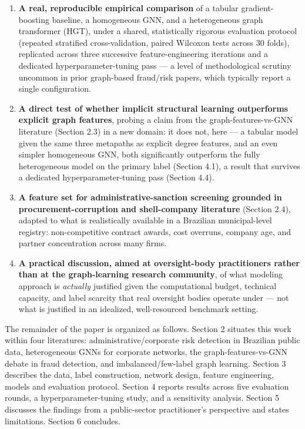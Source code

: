 \documentclass[11pt,]{article}
\providecommand{\tightlist}{%
  \setlength{\itemsep}{0pt}\setlength{\parskip}{0pt}}
\begin{document}
\begin{enumerate}
\def\labelenumi{\arabic{enumi}.}
\tightlist
\item
  \textbf{A real, reproducible empirical comparison} of a tabular
  gradient-boosting baseline, a homogeneous GNN, and a heterogeneous
  graph transformer (HGT), under a shared, statistically rigorous
  evaluation protocol (repeated stratified cross-validation, paired
  Wilcoxon tests across 30 folds), replicated across three successive
  feature-engineering iterations and a dedicated hyperparameter-tuning
  pass --- a level of methodological scrutiny uncommon in prior
  graph-based fraud/risk papers, which typically report a single
  configuration.
\item
  \textbf{A direct test of whether implicit structural learning
  outperforms explicit graph features}, probing a claim from the
  graph-features-vs-GNN literature (Section 2.3) in a new domain: it
  does not, here --- a tabular model given the same three metapaths as
  explicit degree features, and an even simpler homogeneous GNN, both
  significantly outperform the fully heterogeneous model on the primary
  label (Section 4.1), a result that survives a dedicated
  hyperparameter-tuning pass (Section 4.4).
\item
  \textbf{A feature set for administrative-sanction screening grounded
  in procurement-corruption and shell-company literature} (Section 2.4),
  adapted to what is realistically available in a Brazilian
  municipal-level registry: non-competitive contract awards, cost
  overruns, company age, and partner concentration across many firms.
\item
  \textbf{A practical discussion, aimed at oversight-body practitioners
  rather than at the graph-learning research community}, of what
  modeling approach is \emph{actually} justified given the computational
  budget, technical capacity, and label scarcity that real oversight
  bodies operate under --- not what is justified in an idealized,
  well-resourced benchmark setting.
\end{enumerate}

The remainder of the paper is organized as follows. Section 2 situates
this work within four literatures: administrative/corporate risk
detection in Brazilian public data, heterogeneous GNNs for corporate
networks, the graph-features-vs-GNN debate in fraud detection, and
imbalanced/few-label graph learning. Section 3 describes the data, label
construction, network design, feature engineering, models and evaluation
protocol. Section 4 reports results across five evaluation rounds, a
hyperparameter-tuning study, and a sensitivity analysis. Section 5
discusses the findings from a public-sector practitioner's perspective
and states limitations. Section 6 concludes.
\end{document}

